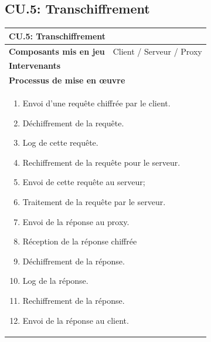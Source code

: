 \documentclass[a4paper,11pt,french]{article}
\begin{document}
\subsection{CU.5: Transchiffrement}
\begin{center}
        \vspace*{0.7cm}
        \begin{tabularx}{16cm}{|l|X|}
        \hline
        \multicolumn{2}{|l|}{\textbf{CU.5: Transchiffrement}}\\
        \hline
        \textbf{Composants mis en jeu} & Client / Serveur / Proxy   \\
        \hline
        \textbf{Intervenants} & \\
        \hline
        \multicolumn{2}{|l|}{\textbf{Processus de mise en \oe uvre} }\\
        \hline
        \multicolumn{2}{|p{15cm}|}{\begin{enumerate}\item Envoi d'une requête chiffrée par le client.\item Déchiffrement de la requête.\item Log de cette requête.\item Rechiffrement de la requête pour le serveur.\item Envoi de cette requête au serveur; \item Traitement de la requête par le serveur. \item Envoi de la réponse au proxy. \item  Réception de la réponse chiffrée \item Déchiffrement de la réponse. \item Log de la réponse. \item Rechiffrement de la réponse. \item Envoi de la réponse au client. \end{enumerate}}\\ 
        \hline 
        \end{tabularx}
\end{center}
\vspace{2cm}
\end{document}
